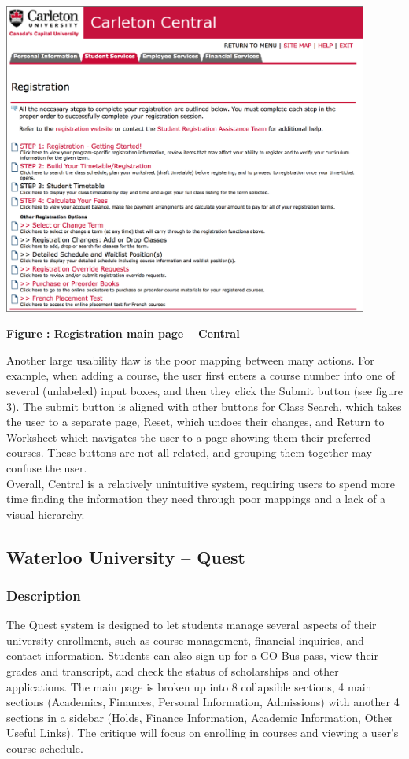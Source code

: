 \documentclass[10pt]{article}
\newenvironment{InlineColumnFigure}
{\par\medskip\noindent\minipage{\linewidth}}
{\endminipage\par\medskip}
\newcommand{\Caption}[1]
{\vspace{-4mm}\fontsize{9}{9}\textbf{Figure \refstepcounter{figCounter} 
\arabic{figCounter}: #1}}
\newcounter{figCounter}
\begin{document}
\begin{multicols}{2}
\begin{InlineColumnFigure}
\begin{center}
	\includegraphics[width=0.9\textwidth]{CarletonScreen2.png}
\end{center}
\Caption{Registration main page -- Central}
\end{InlineColumnFigure}

Another large usability flaw is the poor mapping between many actions. For 
example, when adding a course, the user first enters a course number into one of 
several (unlabeled) input boxes, and then they click the Submit button (see 
figure 3). The submit button is aligned with other buttons for Class Search, 
which takes the user to a separate page, Reset, which undoes their changes, and 
Return to Worksheet which navigates the user to a page showing them their 
preferred courses. These buttons are not all related, and grouping them together 
may confuse the user.\\

Overall, Central is a relatively unintuitive system, requiring users to spend 
more time finding the information they need through poor mappings and a lack of 
a visual hierarchy.

\subsection*{Waterloo University -- Quest}
\subsubsection*{Description}
The Quest system is designed to let students manage several aspects 
of their university enrollment, such as course management, financial inquiries, 
and contact information. Students can also sign up for a GO Bus pass, view their 
grades and transcript, and check the status of scholarships and other 
applications. The main page is broken up into 8 collapsible sections, 4 main 
sections (Academics, Finances, Personal Information, Admissions) with another 4 
sections in a sidebar (Holds, Finance Information, Academic Information, Other 
Useful Links). The critique will focus on enrolling in courses and viewing a 
user's course schedule. 


\end{multicols}
\end{document}
